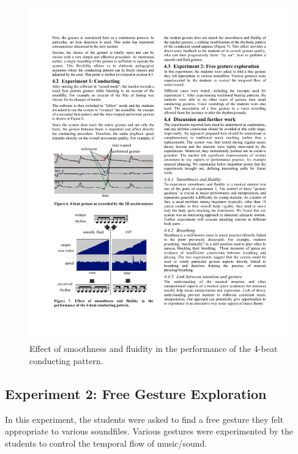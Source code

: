 \begin{figure}[t]
\center
\includegraphics[scale=1.]{fig7.pdf}
%
%
\caption{Effect of smoothness and fluidity in the performance of the 4-beat conducting pattern. }
\label{Bevilacqua:fig7}       %
\end{figure}


\subsection{Experiment 2: Free Gesture Exploration}
\label{Bevilacqua:sec:exp2}

In this experiment, the students were asked to find a free gesture they felt appropriate to various soundfiles. Various gestures were experimented by the students to control the temporal flow of music/sound. 

